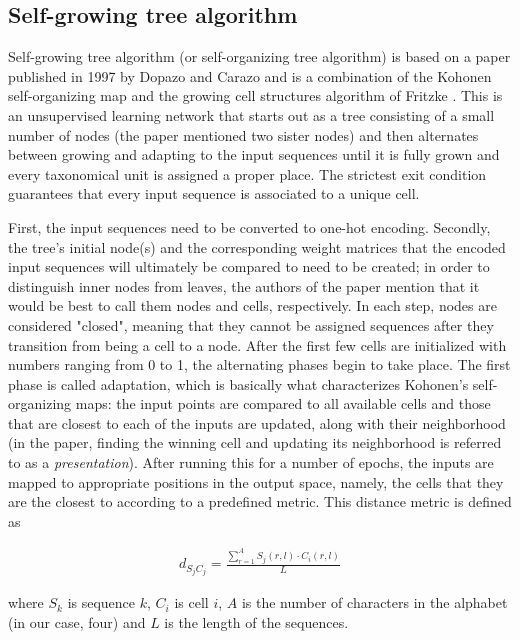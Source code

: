 \documentclass[11pt,twocolumn]{article}
\begin{document}
\subsection{Self-growing tree algorithm}

Self-growing tree algorithm (or self-organizing tree algorithm) is based on a paper published in 1997 by Dopazo and Carazo \cite{Dopazo1997} and is a combination of the Kohonen self-organizing map \cite{58325} and the growing cell structures algorithm of Fritzke \cite{Fritzke1994}. This is an unsupervised learning network that starts out as a tree consisting of a small number of nodes (the paper mentioned two sister nodes) and then alternates between growing and adapting to the input sequences until it is fully grown and every taxonomical unit is assigned a proper place. The strictest exit condition guarantees that every input sequence is associated to a unique cell.

First, the input sequences need to be converted to one-hot encoding. Secondly, the tree's initial node(s) and the corresponding weight matrices that the encoded input sequences will ultimately be compared to need to be created; in order to distinguish inner nodes from leaves, the authors of the paper mention that it would be best to call them nodes and cells, respectively. In each step, nodes are considered "closed", meaning that they cannot be assigned sequences after they transition from being a cell to a node. After the first few cells are initialized with numbers ranging from 0 to 1, the alternating phases begin to take place. The first phase is called adaptation, which is basically what characterizes Kohonen's self-organizing maps: the input points are compared to all available cells and those that are closest to each of the inputs are updated, along with their neighborhood (in the paper, finding the winning cell and updating its neighborhood is referred to as a \textit{presentation}). After running this for a number of epochs, the inputs are mapped to appropriate positions in the output space, namely, the cells that they are the closest to according to a predefined metric. This distance metric is defined as

\begin{align}
d_{S_j C_j} = \frac{\sum_{r = 1}^A S_j(r, l) \cdot C_i(r, l)}{L}
\end{align}

where $S_k$ is sequence $k$, $C_i$ is cell $i$, $A$ is the number of characters in the alphabet (in our case, four) and $L$ is the length of the sequences.
\end{document}

